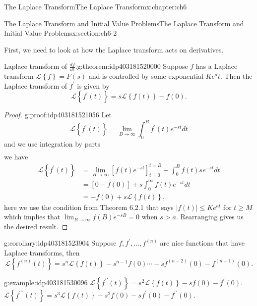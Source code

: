 \documentclass[oneside,10pt,]{book}
\numberwithin{equation}{section}
\numberwithin{equation}{section}
\newcommand{\amp}{&}
\begin{document}
\begin{chapterptx}{The Laplace Transform}{}{The Laplace Transform}{}{}{x:chapter:ch6}
\begin{sectionptx}{The Laplace Transform and Initial Value Problems}{}{The Laplace Transform and Initial Value Problems}{}{}{x:section:ch6-2}
\begin{introduction}{}
First, we need to look at how the Laplace transform acts on derivatives.%
\begin{theorem}{Laplace transform of \(\frac{df}{dt}\).}{}{g:theorem:idp403181520000}%
Suppose \(f\) has a Laplace transform \(\mathcal{L}\left\{ f\right\} = F(s) \) and is controlled by some exponential \(Ke^at\). Then the Laplace transform of \(f^{\prime}\) is given by%
\begin{equation*}
\mathcal{L}\left\{ f^{\prime}(t)\right\} =s\mathcal{L}\left\{ f(t)\right\} -f(0).
\end{equation*}
%
\end{theorem}
\begin{proof}{}{g:proof:idp403181521056}
Let%
\begin{equation*}
\mathcal{L}\left\{ f^{\prime}(t)\right\} =\lim_{B\to\infty}\int_{0}^{B}f^{\prime}(t)e^{-st}dt
\end{equation*}
and we use integration by parts%
\begin{align*}
\end{align*}
we have%
\begin{align*}
\mathcal{L}\left\{ f^{\prime}(t)\right\}  \amp =\lim_{B\to\infty}\left[f(t)e^{-st}\right]_{t=0}^{t=B}+\int_{0}^{B}f(t)se^{-st}dt\\
\amp =\left[0-f(0)\right]+s\int_{0}^{\infty}f(t)e^{-st}dt\\
\amp =-f(0)+s\mathcal{L}\left\{ f(t)\right\} ,
\end{align*}
here we use the condition from Theorem 6.2.1 that says \(\left|f(t)\right|\leq Ke^{at}\) for \(t\geq M\) which implies that \(\lim_{B\to\infty}f(B)e^{-sB}=0\) when \(s>a\).  Rearranging gives us the desired result.%
\end{proof}
\begin{corollary}{}{}{g:corollary:idp403181523904}%
Suppose \(f,f^{\prime},\dots,f^{(n)}\) are nice functions that have Laplace transforms, then%
\begin{equation*}
\mathcal{L}\left\{ f^{(n)}(t)\right\} =s^{n}\mathcal{L}\left\{ f(t)\right\} -s^{n-1}f(0)\cdots-sf^{(n-2)}(0)-f^{(n-1)}(0).
\end{equation*}
%
\end{corollary}
\begin{example}{}{g:example:idp403181530096}%
\(\mathcal{L}\left\{ f^{\prime\prime}(t)\right\} =s^{2}\mathcal{L}\left\{ f(t)\right\} -sf(0)-f^{\prime}(0)\). \(\mathcal{L}\left\{ f^{\prime\prime\prime}(t)\right\} =s^{3}\mathcal{L}\left\{ f(t)\right\} -s^{2}f(0)-sf^{\prime}(0)-f^{\prime\prime}(0)\).\end{example}

\end{introduction}
\end{sectionptx}
\end{chapterptx}
\end{document}
